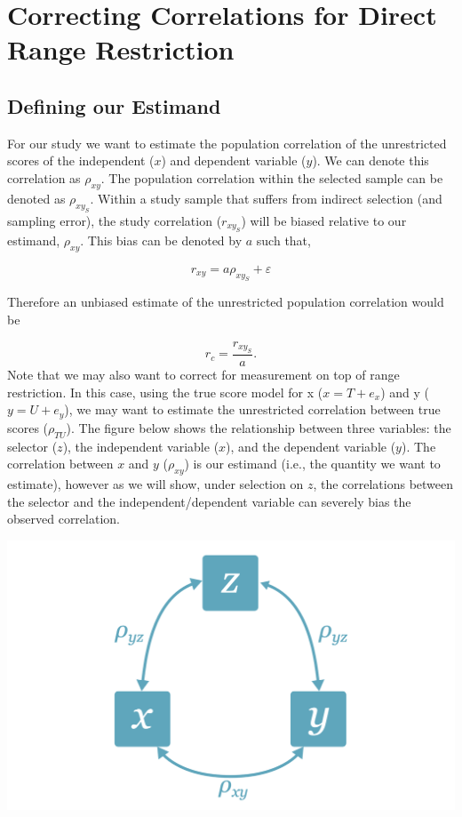 \documentclass[
  letterpaper,
  DIV=11,
  numbers=noendperiod]{scrreprt}
\begin{document}
\hypertarget{correcting-correlations-for-direct-range-restriction-1}{%
\section{Correcting Correlations for Direct Range
Restriction}\label{correcting-correlations-for-direct-range-restriction-1}}

\hypertarget{defining-our-estimand-8}{%
\subsection{Defining our Estimand}\label{defining-our-estimand-8}}

For our study we want to estimate the population correlation of the
unrestricted scores of the independent (\(x\)) and dependent variable
(\(y\)). We can denote this correlation as \(\rho_{xy}\). The population
correlation within the selected sample can be denoted as
\(\rho_{xy_S}\). Within a study sample that suffers from indirect
selection (and sampling error), the study correlation (\(r_{xy_S}\))
will be biased relative to our estimand, \(\rho_{xy}\). This bias can be
denoted by \(a\) such that,

\[
r_{xy} = a \rho_{xy_S} + \varepsilon  
\]

Therefore an unbiased estimate of the unrestricted population
correlation would be

\[
r_c = \frac{ r_{xy_S} }{ a}.
\] Note that we may also want to correct for measurement on top of range
restriction. In this case, using the true score model for x
(\(x=T+e_x\)) and y (\(y = U+e_y\)), we may want to estimate the
unrestricted correlation between true scores (\(\rho_{TU}\)). The figure
below shows the relationship between three variables: the selector
(\(z\)), the independent variable (\(x\)), and the dependent variable
(\(y\)). The correlation between \(x\) and \(y\) (\(\rho_{xy}\)) is our
estimand (i.e., the quantity we want to estimate), however as we will
show, under selection on \(z\), the correlations between the selector
and the independent/dependent variable can severely bias the observed
correlation.

\includegraphics{figure/ind_selection.png}
\end{document}
